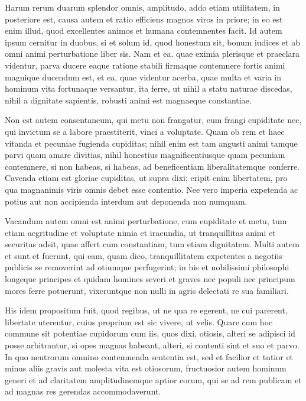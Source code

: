  Harum rerum duarum splendor omnis, amplitudo, addo etiam utilitatem, in posteriore est, causa autem et ratio efficiens magnos viros in priore; in eo est enim illud, quod excellentes animos et humana contemnentes facit. Id autem ipsum cernitur in duobus, si et solum id, quod honestum sit, bonum iudices et ab omni animi perturbatione liber sis. Nam et ea. quae eximia plerisque et praeclara videntur, parva ducere eaque ratione stabili firmaque contemnere fortis animi magnique ducendum est, et ea, quae videntur acerba, quae multa et varia in hominum vita fortunaque versantur, ita ferre, ut nihil a statu naturae discedas, nihil a dignitate sapientis, robusti animi est magnaeque constantiae.

 Non est autem consentaneum, qui metu non frangatur, eum frangi cupiditate nec, qui invictum se a labore praestiterit, vinci a voluptate. Quam ob rem et haec vitanda et pecuniae fugienda cupiditas; nihil enim est tam angusti animi tamque parvi quam amare divitias, nihil honestius magnificentiusque quam pecuniam contemnere, si non habeas, si habeas, ad beneficentiam liberalitatemque conferre. Cavenda etiam est gloriae cupiditas, ut supra dixi; eripit enim libertatem, pro qua magnanimis viris omnis debet esse contentio. Nee vero imperia expetenda ac potius aut non accipienda interdum aut deponenda non numquam.

 Vacandum autem omni est animi perturbatione, cum cupiditate et metu, tum etiam aegritudine et voluptate nimia et iracundia, ut tranquillitas animi et securitas adsit, quae affert cum constantiam, tum etiam dignitatem. Multi autem et sunt et fuerunt, qui eam, quam dico, tranquillitatem expetentes a negotiis publicis se removerint ad otiumque perfugerint; in his et nobilissimi philosophi longeque principes et quidam homines severi et graves nec populi nec principum mores ferre potuerunt, vixeruntque non nulli in agris delectati re sua familiari.

 His idem propositum fuit, quod regibus, ut ne qua re egerent, ne cui parerent, libertate uterentur, cuius proprium est sic vivere, ut velis. Quare cum hoc commune sit potentiae cupidorum cum iis, quos dixi, otiosis, alteri se adipisci id posse arbitrantur, si opes magnas habeant, alteri, si contenti sint et suo et parvo. In quo neutrorum omnino contemnenda sententia est, sed et facilior et tutior et minus aliis gravis aut molesta vita est otiosorum, fructuosior autem hominum generi et ad claritatem amplitudinemque aptior eorum, qui se ad rem publicam et ad magnas res gerendas accommodaverunt.

